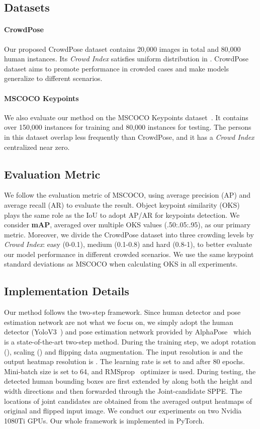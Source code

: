 \documentclass[10pt,twocolumn,letterpaper]{article}
\begin{document}
\subsection{Datasets}
\paragraph{CrowdPose} Our proposed CrowdPose dataset contains 20,000 images in total and 80,000 human instances. Its \textit{Crowd Index} satisfies uniform distribution in . CrowdPose dataset aims to promote performance in crowded cases and make models generalize to different scenarios.

\paragraph{MSCOCO Keypoints} We also evaluate our method on the MSCOCO Keypoints dataset~\cite{mscoco}. It contains over 150,000 instances for training and 80,000 instances for testing. The persons in this dataset overlap less frequently than CrowdPose, and it has a \textit{Crowd Index} centralized near zero.

\subsection{Evaluation Metric}
We follow the evaluation metric of MSCOCO, using average precision (AP) and average recall (AR) to evaluate the result. Object keypoint similarity (OKS) plays the same role as the IoU to adopt AP/AR for keypoints detection. We consider \textbf{mAP}, averaged over multiple OKS values (.50:.05:.95), as our primary metric. Moreover, we divide the CrowdPose dataset into three crowding levels by \textit{Crowd Index}: easy (0-0.1), medium (0.1-0.8) and hard (0.8-1), to better evaluate our model performance in different crowded scenarios. We use the same keypoint standard deviations as MSCOCO when calculating OKS in all experiments. 

\subsection{Implementation Details}


Our method follows the two-step framework. Since human detector and pose estimation network are not what we focus on, we simply adopt the human detector (YoloV3~\cite{yolov3}) and pose estimation network provided by AlphaPose~\cite{alphapose} which is a state-of-the-art two-step method. During the training step, we adopt rotation (), scaling () and flipping data augmentation. The input resolution is  and the output heatmap resolution is . The learning rate is set to  and  after 80 epochs. Mini-batch size is set to 64, and RMSprop~\cite{rmsprop} optimizer is used. During testing, the detected human bounding boxes are first extended by  along both the height and width directions and then forwarded through the Joint-candidate SPPE. The locations of joint candidates are obtained from the averaged output heatmaps of original and flipped input image. We conduct our experiments on two Nvidia 1080Ti GPUs. Our whole framework is implemented in PyTorch.
\end{document}
